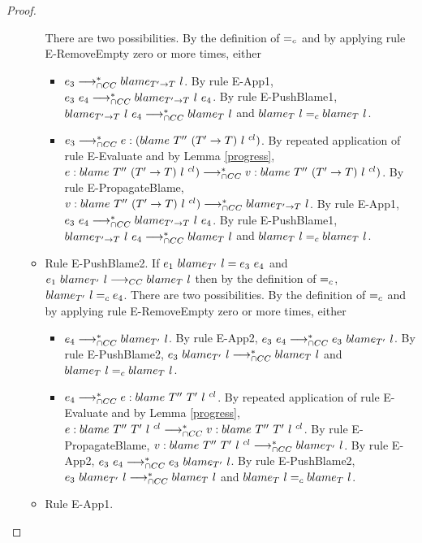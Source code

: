 \documentclass[a4paper]{article}
\begin{document}
\begin{proof}
\begin{itemize}
\begin{itemize}
        There are two possibilities.
        By the definition of $=_c$ and by applying rule E-RemoveEmpty zero or more times, either
        \begin{itemize}
            \item $e_3 \longrightarrow_{\cap CC}^* blame_{T' \rightarrow T}\ l$.
            By rule E-App1, $e_3\ e_4 \longrightarrow_{\cap CC}^* blame_{T' \rightarrow T}\ l\ e_4$.
            By rule E-PushBlame1, $blame_{T' \rightarrow T}\ l\ e_4 \longrightarrow_{\cap CC}^* blame_{T}\ l$ and $blame_{T}\ l =_c blame_{T}\ l$.
            \item $e_3 \longrightarrow_{\cap CC}^* e : (blame\ T''\ (T' \rightarrow T)\ l\ ^{cl})$.
            By repeated application of rule E-Evaluate and by Lemma \ref{progress}, $e : blame\ T''\ (T' \rightarrow T)\ l\ ^{cl}) \longrightarrow_{\cap CC}^* v : blame\ T''\ (T' \rightarrow T)\ l\ ^{cl})$.
            By rule E-PropagateBlame, $v : blame\ T''\ (T' \rightarrow T)\ l\ ^{cl}) \longrightarrow_{\cap CC}^* blame_{T' \rightarrow T}\ l$.
            By rule E-App1, $e_3\ e_4 \longrightarrow_{\cap CC}^* blame_{T' \rightarrow T}\ l\ e_4$.
            By rule E-PushBlame1, $blame_{T' \rightarrow T}\ l\ e_4 \longrightarrow_{\cap CC}^* blame_{T}\ l$ and $blame_{T}\ l =_c blame_{T}\ l$.
        \end{itemize}
        \item Rule E-PushBlame2.
        If $e_1\ \blame{T'}{l} = e_3\ e_4$ and $e_1\ \blame{T'}{l} \longrightarrow_{CC} \blame{T}{l}$ then by the definition of $=_c$, $blame_{T'}\ l =_c e_4$.
        There are two possibilities.
        By the definition of $=_c$ and by applying rule E-RemoveEmpty zero or more times, either
        \begin{itemize}
            \item $e_4 \longrightarrow_{\cap CC}^* blame_{T'}\ l$.
            By rule E-App2, $e_3\ e_4 \gios^* e_3\ \blame{T'}{l}$.
            By rule E-PushBlame2, $e_3\ blame_{T'}\ l \longrightarrow_{\cap CC}^* blame_{T}\ l$ and $blame_{T}\ l =_c blame_{T}\ l$.
            \item $e_4 \longrightarrow_{\cap CC}^* e : blame\ T''\ T'\ l\ ^{cl}$.
            By repeated application of rule E-Evaluate and by Lemma \ref{progress}, $e : blame\ T''\ T'\ l\ ^{cl} \longrightarrow_{\cap CC}^* v : blame\ T''\ T'\ l\ ^{cl}$.
            By rule E-PropagateBlame, $v : blame\ T''\ T'\ l\ ^{cl} \longrightarrow_{\cap CC}^* blame_{T'}\ l$.
            By rule E-App2, $e_3\ e_4 \gios^* e_3\ \blame{T'}{l}$.
            By rule E-PushBlame2, $e_3\ blame_{T'}\ l \longrightarrow_{\cap CC}^* blame_{T}\ l$ and $blame_{T}\ l =_c blame_{T}\ l$.
        \end{itemize}
        \item Rule E-App1.

\end{itemize}
\end{itemize}
\end{proof}
\end{document}
